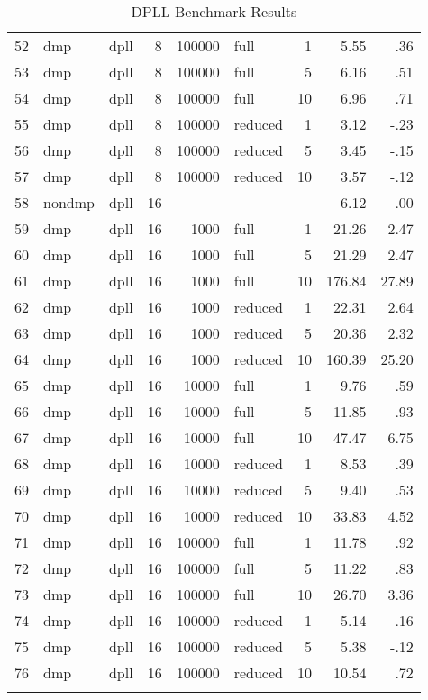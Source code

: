 \begin{center}
\begin{small}
\begin{longtable}{rllrrlrrr}
52 & dmp & dpll & 8 & 100000 & full & 1 & 5.55 & .36\\
53 & dmp & dpll & 8 & 100000 & full & 5 & 6.16 & .51\\
54 & dmp & dpll & 8 & 100000 & full & 10 & 6.96 & .71\\
55 & dmp & dpll & 8 & 100000 & reduced & 1 & 3.12 & -.23\\
56 & dmp & dpll & 8 & 100000 & reduced & 5 & 3.45 & -.15\\
57 & dmp & dpll & 8 & 100000 & reduced & 10 & 3.57 & -.12\\
\hline
58 & nondmp & dpll & 16 & - & - & - & 6.12 & .00\\
59 & dmp & dpll & 16 & 1000 & full & 1 & 21.26 & 2.47\\
60 & dmp & dpll & 16 & 1000 & full & 5 & 21.29 & 2.47\\
61 & dmp & dpll & 16 & 1000 & full & 10 & 176.84 & 27.89\\
62 & dmp & dpll & 16 & 1000 & reduced & 1 & 22.31 & 2.64\\
63 & dmp & dpll & 16 & 1000 & reduced & 5 & 20.36 & 2.32\\
64 & dmp & dpll & 16 & 1000 & reduced & 10 & 160.39 & 25.20\\
65 & dmp & dpll & 16 & 10000 & full & 1 & 9.76 & .59\\
66 & dmp & dpll & 16 & 10000 & full & 5 & 11.85 & .93\\
67 & dmp & dpll & 16 & 10000 & full & 10 & 47.47 & 6.75\\
68 & dmp & dpll & 16 & 10000 & reduced & 1 & 8.53 & .39\\
69 & dmp & dpll & 16 & 10000 & reduced & 5 & 9.40 & .53\\
70 & dmp & dpll & 16 & 10000 & reduced & 10 & 33.83 & 4.52\\
71 & dmp & dpll & 16 & 100000 & full & 1 & 11.78 & .92\\
72 & dmp & dpll & 16 & 100000 & full & 5 & 11.22 & .83\\
73 & dmp & dpll & 16 & 100000 & full & 10 & 26.70 & 3.36\\
74 & dmp & dpll & 16 & 100000 & reduced & 1 & 5.14 & -.16\\
75 & dmp & dpll & 16 & 100000 & reduced & 5 & 5.38 & -.12\\
76 & dmp & dpll & 16 & 100000 & reduced & 10 & 10.54 & .72\\
\hline
\caption{DPLL Benchmark Results}
\label{tab:dpll_results}
\end{longtable}
\end{small}
\end{center}

